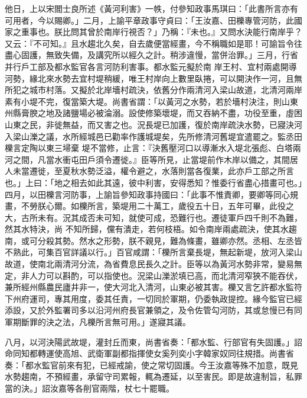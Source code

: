\begin{pinyinscope}
 他日，上以宋閻士良所述《黃河利害》一帙，付參知政事馬琪曰：「此書所言亦有可用者，今以賜卿。」二月，上諭平章政事守貞曰：「王汝嘉、田櫟專管河防，此國家之重事也。朕比問其曾於南岸行視否？」乃稱：『未也。』又問水決能行南岸乎？又云：『不可知。』且水趨北久矣，自去歲便當經畫，今不稱職如是耶！可諭旨令往盡心固護，無致失備，及講究所以經久之計。稍涉違慢，當併治罪。」三月，行省并行戶工部及都水監官各言河防利害事。都水監元擬於南
 岸王村、宜村兩處開導河勢，緣北來水勢去宜村堤稍緩，唯王村岸向上數里臥捲，可以開決作一河，且無所犯之城市村落。又擬於北岸墻村疏決，依舊分作兩清河入梁山故道，北清河兩岸素有小堤不完，復當築大堤。尚書省謂：「以黃河之水勢，若於墻村決注，則山東州縣膏腴之地及諸鹽場必被淪溺。設使修築壞堤，而又吞納不盡，功役至重，虛困山東之民，非徙無益，而又害之也。況長堤已加護，復於南岸疏決水勢，已寢決河入梁山濼之議，水所經城邑已勸率作護城堤矣，先所修清河舊堤宜遣罷之。監丞田櫟言定陶以東三埽棄
 堤不當修，止言：『決舊壓河口以導漸水入堤北張彪、白塔兩河之間，凡當水衝屯田戶須令遷徙。』臣等所見，止當堤前作木岸以備之，其間居人未當遷徙，至夏秋水勢泛溢，權令避之，水落則當各復業，此亦戶工部之所言也。」上曰：「地之相去如此其遠，彼中利害，安得悉知？惟委行省盡心措畫可也。」四月，以田櫟言河防事，上諭旨參知政事持國曰：「此事不惟責卿，要卿等同心規畫，不勞朕心爾。如櫟所言，築堤用二十萬工，歲役五十日，五年可畢，此役之大，古所未有。況其成否未可知，就使可成，恐難行也。遷徒軍戶四千則不為難，然其水特決，尚
 不知所歸，儻有潰走，若何枝梧。如令南岸兩處疏決，使其水趨南，或可分殺其勢。然水之形勢，朕不親見，難為條畫，雖卿亦然。丞相、左丞皆不熟此，可集百官詳議以行。」百官咸謂：「櫟所言棄長堤，無起新堤，放河入梁山故道，使南北兩清河分流，為省費息民長久之計。臣等以為黃河水勢非常，變易無定，非人力可以斟酌，可以指使也。況梁山濼淤填已高，而北清河窄狹不能吞伏，兼所經州縣農民廬井非一，使大河北入清河，山東必被其害。櫟又言乞許都水監符下州府運司，專其用度，委其任責，一切同於軍期，仍委執政提控。緣今監官已經
 添設，又於外監署司多以沿河州府長官兼領之，及令佐管勾河防，其或怠慢已有同軍期斷罪的決之法，凡櫟所言無可用。」遂寢其議。



 八月，以河決陽武故堤，灌封丘而東，尚書省奏：「都水監、行部官有失固護。」詔命同知都轉運使高旭、武衛軍副都指揮使女奚列奕小字韓家奴同往規措。尚書省奏：「都水監官前來有犯，已經戒諭，使之常切固護。今王汝嘉等殊不加意，既見水勢趨南，不預經畫，承留守司累報，輒為遷延，以至害民。即是故違制旨，私罪當的決。」詔汝嘉等各削官兩階，杖七十罷職。




\end{pinyinscope}
